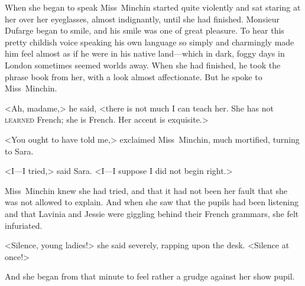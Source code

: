 When she began to speak Miss~Minchin started quite violently and sat staring at her over her eyeglasses, almost indignantly, until she had finished. Monsieur Dufarge began to smile, and his smile was one of great pleasure. To hear this pretty childish voice speaking his own language so simply and charmingly made him feel almost as if he were in his native land—which in dark, foggy days in London sometimes seemed worlds away. When she had finished, he took the phrase book from her, with a look almost affectionate. But he spoke to Miss~Minchin.

<Ah, madame,> he said, <there is not much I can teach her. She has not \textsc{learned} French; she is French. Her accent is exquisite.>

<You ought to have told me,> exclaimed Miss~Minchin, much mortified, turning to Sara.

<I—I tried,> said Sara. <I—I suppose I did not begin right.>

Miss~Minchin knew she had tried, and that it had not been her fault that she was not allowed to explain. And when she saw that the pupils had been listening and that Lavinia and Jessie were giggling behind their French grammars, she felt infuriated.

<Silence, young ladies!> she said severely, rapping upon the desk. <Silence at once!>

And she began from that minute to feel rather a grudge against her show pupil.